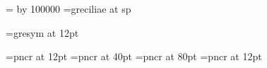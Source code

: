 
\def\Abar{%
{\gregoriansymbolfont \char 64}%
\relax%
}

\def\Rbar{%
{\gregoriansymbolfont \char 65}%
\relax%
}

\def\Vbar{%
{\gregoriansymbolfont \char 66}%
\relax%
}

\def\Vbarsmall{%
{\gregoriansymbolfont \char 72}%
\relax%
}

\def\gredagger{%
{\gregoriansymbolfont \char 68}%
\relax%
}

\def\grecross{%
{\gregoriansymbolfont \char 70}%
\relax%
}

\def\grestar{%
\gresixstar %
\relax%
}

\def\greheightstar{%
{\gregoriansymbolfont \char 69}%
\relax %
}

\def\gresixstar{%
{\gregoriansymbolfont \char 71}%
\relax %
}

\def\greitalic#1{%
{\it #1}%
\relax %
}

\def\gresmallcaps#1{%
{\sc #1}%
\relax %
}

\def\greboldfont#1{%
{\bf #1}%
\relax %
}

\def\grett#1{%
{\tt #1}%
\relax %
}

\newcount\tempfactor %

\def\setgregorianfont#1{%
\tempfactor = \the\factor %
\multiply\tempfactor by 100000 %
\global\font\gregorianfont=#1 at \the\tempfactor sp%
\relax%
}

\tempfactor = \the\factor %
\multiply\tempfactor by 100000 %
\font\gregorianfont=greciliae at \the\tempfactor sp

\font\gregoriansymbolfont=gresym at 12pt

\def\gretextformat#1{%
{\textfont #1}%
\relax %
}

\font\textfont=pncr at 12pt
\font\fontofinitial=pncr at 40pt
\font\fontofbiginitial=pncr at 80pt
\font\fontoftranslation=pncr at 12pt

\def\setfactor#1{%
\global\factor=#1 %
\relax %
}
